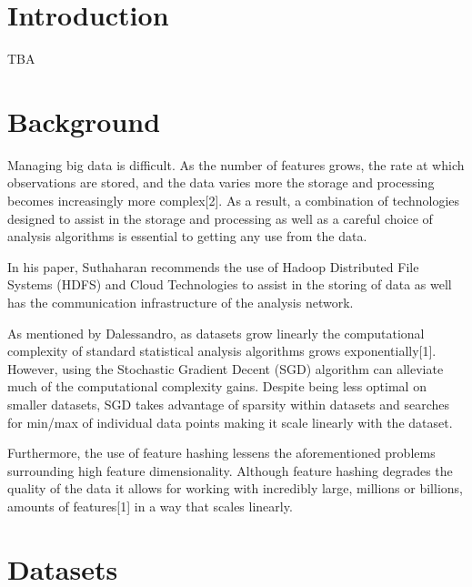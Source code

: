 \documentclass[twoside]{article}
\begin{document}
\begin{multicols}{2} %

\section{Introduction}

TBA

\section{Background}

Managing big data is difficult. As the number of features grows, the rate at which observations are stored, and the data varies more the storage and processing becomes increasingly more complex[2]. As a result, a combination of technologies designed to assist in the storage and processing as well as a careful choice of analysis algorithms is essential to getting any use from the data. 

In his paper, Suthaharan recommends the use of Hadoop Distributed File Systems (HDFS) and Cloud Technologies to assist in the storing of data as well has the communication infrastructure of the analysis network. 

As mentioned by Dalessandro, as datasets grow linearly the computational complexity of
standard statistical analysis algorithms grows exponentially[1]. However, using the Stochastic Gradient Decent (SGD) algorithm can alleviate much of the computational complexity gains. Despite being less optimal on smaller datasets, SGD takes advantage of sparsity within datasets and searches for min/max of individual data points making it scale linearly with the dataset.

Furthermore, the use of feature hashing lessens the aforementioned problems surrounding high feature dimensionality. Although feature hashing degrades the quality of the data it allows for working with incredibly large, millions or billions, amounts of features[1] in a way that scales linearly.


\section{Datasets}


\end{multicols}
\end{document}
